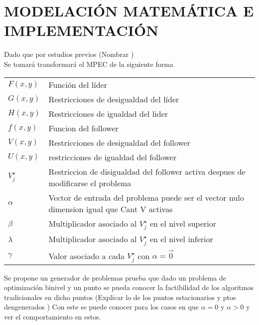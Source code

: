 \chapter{MODELACIÓN MATEMÁTICA E IMPLEMENTACIÓN}

Dado que por estudios previos (Nombrar )\\

Se tomará transformará el MPEC de la siguiente forma


\begin{table}[H]
    \begin{tabular}{l m{360pt}}
        $ F(x,y) $              & Función del líder                                                                                                          \\
        $ G(x,y) $              & Restricciones de desigualdad del líder                                                                                                            \\
        $ H(x,y) $                 & Restricciones de igualdad del lider                       \\
        $ f(x,y) $           & Funcion del follower                                                               \\
        $ V(x,y) $              &  Restricciones de desigualdad del follower  \\
        $ U(x,y) $     & restricciones de igualdad del follower\\
        $ V_{j}^{\star} $    & Restriccion de disigualdad del follower activa despues de modificarse el problema            \\
        $ \alpha  $             & Vector de entrada del problema puede ser el vector nulo  dimension igual que Cant V activas                                                                                                        \\
        $ \beta $               & Multiplicador asociado al $V_{j}^{\star}$ en el nivel superior          \\
        $ \lambda $              & Multiplicador asociado al $V_{j}^{\star}$ en el nivel inferior\\
        $\gamma$                & Valor asociado a cada $V_{j}^{\star}$ con $\alpha=\vec{0}$\\
    \end{tabular}

    \end{table}
Se propone un generador de problemas prueba que dado un problema de optimización binivel y un punto 
se pueda conocer la factibilidad de los algoritmos tradicionales en dicho puntos (Explicar lo de los puntos estacionarios y ptos dengenerados )
Con este se puede conocer para los casos en que $\alpha=0$ y $\alpha>0$ y ver el comportamiento en estos.


